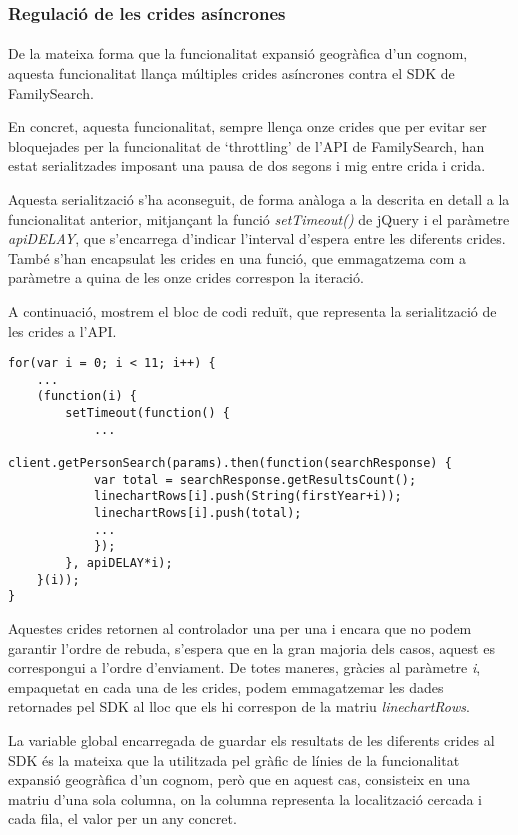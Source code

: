 \subsubsection{Regulació de les crides asíncrones}

\paragraph{}
De la mateixa forma que la funcionalitat expansió geogràfica d’un cognom, aquesta funcionalitat llança múltiples crides asíncrones contra el SDK de FamilySearch.

En concret, aquesta funcionalitat, sempre llença onze crides que per evitar ser bloquejades per la funcionalitat de `throttling' de l’API de FamilySearch, han estat serialitzades imposant una pausa de dos segons i mig entre crida i crida.

Aquesta serialització s'ha aconseguit, de forma anàloga a la descrita en detall a la funcionalitat anterior, mitjançant la funció \emph{setTimeout()} de jQuery i el paràmetre \emph{apiDELAY}, que s'encarrega d'indicar l'interval d'espera entre les diferents crides. També s'han encapsulat les crides en una funció, que emmagatzema com a paràmetre a quina de les onze crides correspon la iteració.

A continuació, mostrem el bloc de codi reduït, que representa la serialització de les crides a l’API.

\begin{lstlisting}[style=rawOwn,caption={Separació manual de les crides asíncrones al SDK}]
for(var i = 0; i < 11; i++) {
    ...
    (function(i) {
        setTimeout(function() {
            ...
            client.getPersonSearch(params).then(function(searchResponse) {
            var total = searchResponse.getResultsCount();
            linechartRows[i].push(String(firstYear+i));
            linechartRows[i].push(total);
            ...
            });
        }, apiDELAY*i);
    }(i));
}
\end{lstlisting}

Aquestes crides retornen al controlador una per una i encara que no podem garantir l'ordre de rebuda, s’espera que en la gran majoria dels casos, aquest es correspongui a l’ordre d’enviament. De totes maneres, gràcies al paràmetre \emph{i}, empaquetat en cada una de les crides, podem emmagatzemar les dades retornades pel SDK al lloc que els hi correspon de la matriu \emph{linechartRows}.

La variable global encarregada de guardar els resultats de les diferents crides al SDK és la mateixa que la utilitzada pel gràfic de línies de la funcionalitat expansió geogràfica d'un cognom, però que en aquest cas, consisteix en una matriu d'una sola columna, on la columna representa la localització cercada i cada fila, el valor per un any concret.

